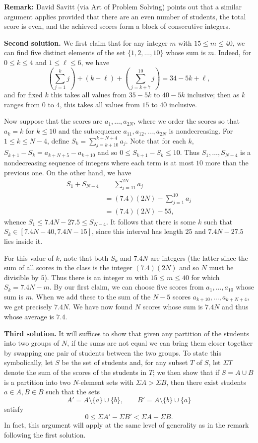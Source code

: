 \documentclass[amssymb,twocolumn,pra,10pt,aps]{revtex4-1}
\begin{document}
\begin{itemize}
\noindent
\textbf{Remark:}
David Savitt (via Art of Problem Solving) points out that a similar argument applies provided that
there are an even number of students, the total score is even, and the achieved scores form a block of consecutive integers.

\noindent
\textbf{Second solution.}
We first claim that for any integer $m$ with $15 \leq m \leq 40$, we can find five distinct elements of the set $\{1,2,\ldots,10\}$ whose sum is $m$. Indeed, for $0 \leq k \leq 4$ and $1 \leq \ell \leq 6$, we have
\[
\left(\sum_{j=1}^k j \right) + (k+\ell) + \left(\sum_{j=k+7}^{10} j \right) = 34-5k+\ell,\]
and for fixed $k$ this takes all values from $35-5k$ to $40-5k$ inclusive; then as $k$ ranges from $0$ to $4$, this takes all values from $15$ to $40$ inclusive.

Now suppose that the scores are $a_1,\ldots,a_{2N}$, where we order the scores so that $a_k=k$ for $k \leq 10$ and the subsequence $a_{11},a_{12},\ldots,a_{2N}$ is nondecreasing. For $1 \leq k \leq N-4$, define $S_k = \sum_{j=k+10}^{k+N+4} a_j$. Note that for each $k$, $S_{k+1}-S_k = a_{k+N+5}-a_{k+10}$ and so $0 \leq S_{k+1}-S_k \leq 10$. Thus $S_1,\ldots,S_{N-4}$ is a nondecreasing sequence of integers where each term is at most $10$ more than the previous one. On the other hand, we have 
\begin{align*}
S_1 + S_{N-4} &= \sum_{j=11}^{2N} a_j \\
&= (7.4)(2N)-\sum_{j=1}^{10} a_j \\
&= (7.4)(2N)-55,
\end{align*}
whence $S_1 \leq 7.4N-27.5 \leq S_{N-4}$. It follows that there is some $k$ such that $S_k \in [7.4N-40, 7.4N-15]$, since this interval has length $25$ and $7.4N-27.5$ lies inside it.


For this value of $k$, note that both $S_k$ and $7.4N$ are integers (the latter since the sum of all scores in the class is the integer $(7.4)(2N)$ and so $N$ must be divisible by $5$). Thus there is an integer $m$ with $15 \leq m \leq 40$ for which $S_k = 7.4N-m$. By our first claim, we can choose five scores from $a_1,\ldots,a_{10}$ whose sum is $m$. When we add these to the sum of the $N-5$ scores $a_{k+10},\ldots,a_{k+N+4}$, we get precisely $7.4N$. We have now found $N$ scores whose sum is $7.4N$ and thus whose average is $7.4$.

\noindent
\textbf{Third solution.}
It will suffices to show that given any partition of the students into two groups of $N$, if the sums are not equal we can bring them closer together by swapping one pair of students between the two groups. To state this symbolically,
let $S$ be the set of students and, for any subset $T$ of $S$, let $\Sigma T$ denote the sum of the scores of the students in $T$; we then show that if $S = A \cup B$ is a partition into two $N$-element sets with
$\Sigma A > \Sigma B$, then there exist students $a \in A, B \in B$ such that the sets
\[
A' = A \setminus \{a\} \cup \{b\}, \qquad
B' = A \setminus \{b\} \cup \{a\}
\]
satisfy
\[
0 \leq \Sigma A' - \Sigma B' < \Sigma A - \Sigma B.
\]
In fact, this argument will apply at the same level of generality as in the remark following the first solution.


\end{itemize}
\end{document}
